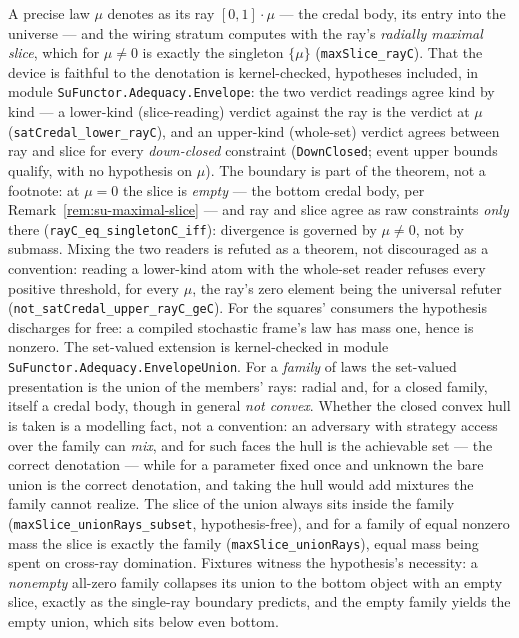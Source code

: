 \begin{remark}
\label{rem:su-envelope-reconciliation}
A precise law $\mu$ denotes as its ray $[0,1]\cdot\mu$ --- the
credal body, its entry into the universe --- and the wiring stratum
computes with the ray's \emph{radially maximal slice}, which for
$\mu \neq 0$ is exactly the singleton $\{\mu\}$
(\texttt{maxSlice\_rayC}). That the device is faithful to the
denotation is kernel-checked, hypotheses included, in module
\texttt{SuFunctor.Adequacy.Envelope}: the two verdict readings
agree kind by kind --- a lower-kind (slice-reading) verdict against
the ray is the verdict at $\mu$
(\texttt{satCredal\_lower\_rayC}), and an upper-kind (whole-set)
verdict agrees between ray and slice for every
\emph{down-closed} constraint (\texttt{DownClosed}; event upper
bounds qualify, with no hypothesis on $\mu$). The boundary is part
of the theorem, not a footnote: at $\mu = 0$ the slice is
\emph{empty} --- the bottom credal body, per
Remark~\ref{rem:su-maximal-slice} --- and ray and slice
agree as raw constraints \emph{only} there
(\texttt{rayC\_eq\_singletonC\_iff}): divergence is governed by
$\mu \neq 0$, not by submass. Mixing the two readers is
refuted as a theorem, not discouraged as a convention: reading a
lower-kind atom with the whole-set reader refuses every positive
threshold, for every $\mu$, the ray's zero element being the
universal refuter (\texttt{not\_satCredal\_upper\_rayC\_geC}). For
the squares' consumers the hypothesis discharges for free: a
compiled stochastic frame's law has mass one, hence is nonzero. The
set-valued extension is kernel-checked in module
\texttt{SuFunctor.Adequacy.EnvelopeUnion}. For a \emph{family} of
laws the set-valued presentation is the union of the members' rays:
radial and, for a closed family, itself a credal body, though
in general \emph{not convex}. Whether the closed convex hull is
taken is a modelling fact, not a convention: an adversary with
strategy access over the family can \emph{mix}, and for such faces
the hull is the achievable set --- the correct denotation --- while
for a parameter fixed once and unknown the bare union is the correct
denotation, and taking the hull would add mixtures the family cannot
realize. The
slice of the union always sits inside the family
(\texttt{maxSlice\_unionRays\_subset}, hypothesis-free), and for a
family of equal nonzero mass the slice is exactly the family
(\texttt{maxSlice\_unionRays}), equal mass being spent on
cross-ray domination. Fixtures witness the hypothesis's necessity:
a \emph{nonempty} all-zero family collapses its union to the bottom
object with an empty slice, exactly as the single-ray boundary
predicts, and the empty family yields the empty union, which sits
below even bottom.
\end{remark}

